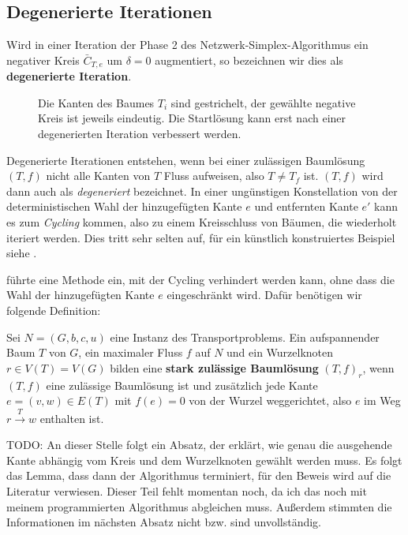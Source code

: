 \subsection{Degenerierte Iterationen}\label{ch:deg}

\begin{defn}Wird in einer Iteration der Phase 2 des Netzwerk-Simplex-Algorithmus ein negativer Kreis $\bar{C}_{T,e}$ um $\delta=0$ augmentiert, so bezeichnen wir dies als \textbf{degenerierte Iteration}.
\end{defn}

\begin{figure}[!ht]\centering
	
	\caption{Die Kanten des Baumes $T_i$ sind gestrichelt, der gewählte negative Kreis ist jeweils eindeutig. Die Startlösung kann erst nach einer degenerierten Iteration verbessert werden.}
	\label{fig:deg}
\end{figure}

Degenerierte Iterationen entstehen, wenn bei einer zulässigen Baumlösung $(T,f)$ nicht alle Kanten von $T$ Fluss aufweisen, also $T\neq T_f$ ist. $(T,f)$ wird dann auch als \emph{degeneriert} bezeichnet. In einer ungünstigen Konstellation von der deterministischen Wahl der hinzugefügten Kante $e$ und entfernten Kante $e'$ kann es zum \emph{Cycling} kommen, also zu einem Kreisschluss von Bäumen, die wiederholt iteriert werden. Dies tritt sehr selten auf, für ein künstlich konstruiertes Beispiel siehe \cite[S. 303]{NSAbook}.

\cite[Cunningham, 1976]{cycling} führte eine Methode ein, mit der Cycling verhindert werden kann, ohne dass die Wahl der hinzugefügten Kante $e$ eingeschränkt wird. Dafür benötigen wir folgende Definition:

\begin{defn}Sei $N=(G,b,c,u)$ eine Instanz des Transportproblems. Ein aufspannender Baum $T$ von $G$, ein maximaler Fluss $f$ auf $N$ und ein Wurzelknoten $r\in V(T)=V(G)$ bilden eine \textbf{stark zulässige Baumlösung} $(T,f)_r$, wenn $(T,f)$ eine zulässige Baumlösung ist und zusätzlich jede Kante $e=(v,w)\in E(T)$ mit $f(e)=0$ von der Wurzel weggerichtet, also $e$ im Weg $r\xrightarrow{T}w$ enthalten ist.\end{defn}


TODO: An dieser Stelle folgt ein Absatz, der erklärt, wie genau die ausgehende Kante abhängig vom Kreis und dem Wurzelknoten gewählt werden muss. Es folgt das Lemma, dass dann der Algorithmus terminiert, für den Beweis wird auf die Literatur verwiesen. Dieser Teil fehlt momentan noch, da ich das noch mit meinem programmierten Algorithmus abgleichen muss. Außerdem stimmten die Informationen im nächsten Absatz nicht bzw. sind unvollständig.

